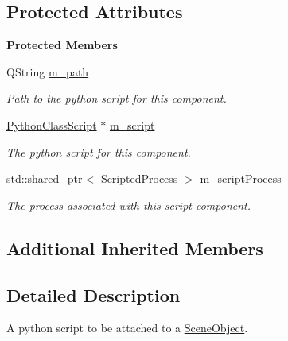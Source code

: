 \subsection*{Protected Attributes}
\begin{Indent}\textbf{ Protected Members}\par
\begin{DoxyCompactItemize}
\item 
\mbox{\label{classrev_1_1_script_component_ab21eaba5b5e5fdfdf08b92e58ea8f66f}} 
Q\+String \mbox{\hyperlink{classrev_1_1_script_component_ab21eaba5b5e5fdfdf08b92e58ea8f66f}{m\+\_\+path}}
\begin{DoxyCompactList}\small\item\em Path to the python script for this component. \end{DoxyCompactList}\item 
\mbox{\label{classrev_1_1_script_component_a6cf553b24ea26e45e54a1f6b4a6177f7}} 
\mbox{\hyperlink{classrev_1_1_python_class_script}{Python\+Class\+Script}} $\ast$ \mbox{\hyperlink{classrev_1_1_script_component_a6cf553b24ea26e45e54a1f6b4a6177f7}{m\+\_\+script}}
\begin{DoxyCompactList}\small\item\em The python script for this component. \end{DoxyCompactList}\item 
\mbox{\label{classrev_1_1_script_component_a6ea48eab12b953829a021286a9dbf2f1}} 
std\+::shared\+\_\+ptr$<$ \mbox{\hyperlink{classrev_1_1_scripted_process}{Scripted\+Process}} $>$ \mbox{\hyperlink{classrev_1_1_script_component_a6ea48eab12b953829a021286a9dbf2f1}{m\+\_\+script\+Process}}
\begin{DoxyCompactList}\small\item\em The process associated with this script component. \end{DoxyCompactList}\end{DoxyCompactItemize}
\end{Indent}
\subsection*{Additional Inherited Members}


\subsection{Detailed Description}
A python script to be attached to a \mbox{\hyperlink{classrev_1_1_scene_object}{Scene\+Object}}. 

